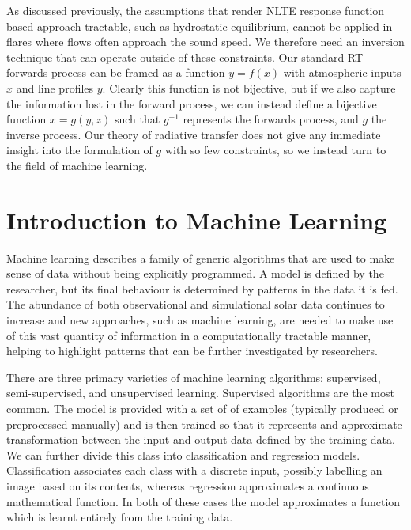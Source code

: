 As discussed previously, the assumptions that render NLTE response function based approach tractable, such as hydrostatic equilibrium, cannot be applied in flares where flows often approach the sound speed.
We therefore need an inversion technique that can operate outside of these constraints.
Our standard RT forwards process can be framed as a function $y = f(x)$ with atmospheric inputs $x$ and line profiles $y$.
Clearly this function is not bijective, but if we also capture the information lost in the forward process, we can instead define a bijective function $x = g(y, z)$ such that $g^{-1}$ represents the forwards process, and $g$ the inverse process.
Our theory of radiative transfer does not give any immediate insight into the formulation of $g$ with so few constraints, so we instead turn to the field of machine learning.

\section{Introduction to Machine Learning}

Machine learning describes a family of generic algorithms that are used to make sense of data without being explicitly programmed.
A model is defined by the researcher, but its final behaviour is determined by patterns in the data it is fed.
The abundance of both observational and simulational solar data continues to increase and new approaches, such as machine learning, are needed to make use of this vast quantity of information in a computationally tractable manner, helping to highlight patterns that can be further investigated by researchers.

There are three primary varieties of machine learning algorithms: supervised, semi-supervised, and unsupervised learning.
Supervised algorithms are the most common.
The model is provided with a set of of examples (typically produced or preprocessed manually) and is then trained so that it represents and approximate transformation between the input and output data defined by the training data.
We can further divide this class into classification and regression models.
Classification associates each class with a discrete input, possibly labelling an image based on its contents, whereas regression approximates a continuous mathematical function.
In both of these cases the model approximates a function which is learnt entirely from the training data.


